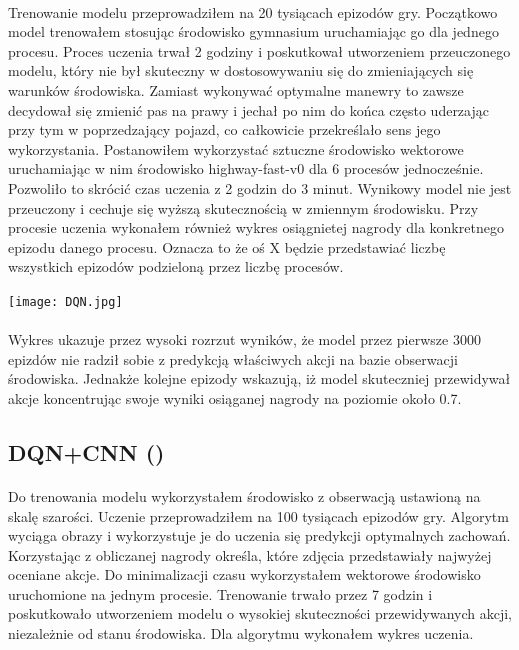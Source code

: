 \documentclass{article}
\begin{document}
\paragraph{}
 Trenowanie modelu przeprowadziłem na 20 tysiącach epizodów gry. Początkowo model trenowałem stosując środowisko gymnasium uruchamiając go dla jednego procesu. Proces uczenia trwał 2 godziny i poskutkował utworzeniem przeuczonego modelu, który nie był skuteczny w dostosowywaniu się do zmieniających się warunków środowiska. Zamiast wykonywać optymalne manewry to zawsze decydował się zmienić pas na prawy i jechał po nim do końca często uderzając przy tym w poprzedzający pojazd, co całkowicie przekreślało sens jego wykorzystania. Postanowiłem wykorzystać sztuczne środowisko wektorowe uruchamiając w nim środowisko highway-fast-v0 dla 6 procesów jednocześnie. Pozwoliło to skrócić czas uczenia z 2 godzin do 3 minut. Wynikowy model nie jest przeuczony i cechuje się wyższą skutecznością w zmiennym środowisku. Przy procesie uczenia wykonałem również wykres osiągnietej nagrody dla konkretnego epizodu danego procesu. Oznacza to że oś X będzie przedstawiać liczbę wszystkich epizodów podzieloną przez liczbę procesów.


\texttt{[image: DQN.jpg]}
\paragraph{}
Wykres ukazuje przez wysoki rozrzut wyników, że model przez pierwsze 3000 epizdów nie radził sobie z predykcją właściwych akcji na bazie obserwacji środowiska. Jednakże kolejne epizody wskazują, iż model skuteczniej przewidywał akcje koncentrując swoje wyniki osiąganej nagrody na poziomie około 0.7.

\newpage

\subsection{DQN+CNN ()}
\paragraph{}
Do trenowania modelu wykorzystałem środowisko z obserwacją ustawioną na skalę szarości. Uczenie przeprowadziłem na 100 tysiącach epizodów gry. Algorytm wyciąga obrazy i wykorzystuje je do uczenia się predykcji optymalnych zachowań. Korzystając z obliczanej nagrody określa, które zdjęcia przedstawiały najwyżej oceniane akcje. Do minimalizacji czasu wykorzystałem wektorowe środowisko uruchomione na jednym procesie. Trenowanie trwało przez 7 godzin i poskutkowało utworzeniem modelu o wysokiej skuteczności przewidywanych akcji, niezależnie od stanu środowiska. Dla algorytmu wykonałem wykres uczenia.
\end{document}
